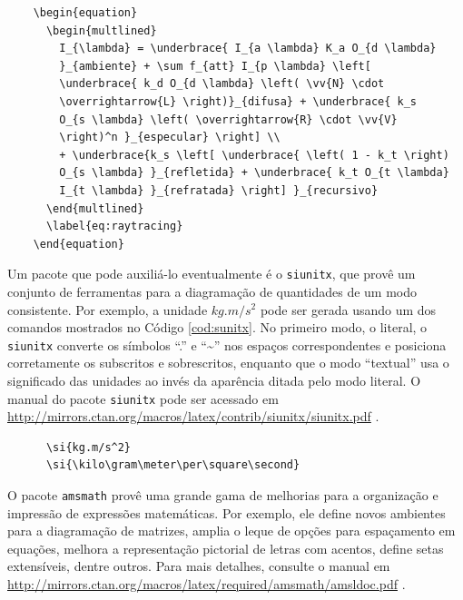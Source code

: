 \begin{listing}[ht]
	\begin{verbatim}
	\begin{equation}
	  \begin{multlined}
	    I_{\lambda} = \underbrace{ I_{a \lambda} K_a O_{d \lambda} 
	    }_{ambiente} + \sum f_{att} I_{p \lambda} \left[ 
	    \underbrace{ k_d O_{d \lambda} \left( \vv{N} \cdot 
	    \overrightarrow{L} \right)}_{difusa} + \underbrace{ k_s 
	    O_{s \lambda} \left( \overrightarrow{R} \cdot \vv{V}  
	    \right)^n }_{especular} \right] \\ 
	    + \underbrace{k_s \left[ \underbrace{ \left( 1 - k_t \right) 
	    O_{s \lambda} }_{refletida} + \underbrace{ k_t O_{t \lambda} 
	    I_{t \lambda} }_{refratada} \right] }_{recursivo}
	  \end{multlined}
	  \label{eq:raytracing}
	\end{equation}
	\end{verbatim}
	\caption{Código \LaTeX{} usado para gerar a Equação \ref{eq:raytracing}.}
	\label{cod:raytracing}
\end{listing}

Um pacote que pode auxiliá-lo eventualmente é o \texttt{siunitx}, que provê um conjunto de ferramentas para a diagramação de quantidades de um modo consistente. Por exemplo, a unidade $\si{kg.m/s^2}$ pode ser gerada usando um dos comandos mostrados no Código \ref{cod:sunitx}. No primeiro modo, o literal, o \texttt{siunitx} converte os símbolos ``.'' e ``\~{}'' nos espaços correspondentes e posiciona corretamente os subscritos e sobrescritos, enquanto que o modo ``textual'' usa o significado das unidades ao invés da aparência ditada pelo modo literal. O manual do pacote \texttt{siunitx} pode ser acessado em \url{http://mirrors.ctan.org/macros/latex/contrib/siunitx/siunitx.pdf} \parencite{siunitx}.

\begin{listing}[ht]
	\begin{verbatim}
	  \si{kg.m/s^2}
	  \si{\kilo\gram\meter\per\square\second}	
	\end{verbatim}
	\caption{Código \LaTeX{} usado para gerar a unidade $\si{\kilo\gram\meter\per\square\second}$.}
	\label{cod:sunitx}
\end{listing}

O pacote \texttt{amsmath} provê uma grande gama de melhorias para a organização e impressão de expressões matemáticas. Por exemplo, ele define novos ambientes para a diagramação de matrizes, amplia o leque de opções para espaçamento em equações, melhora a representação pictorial de letras com acentos, define setas extensíveis, dentre outros. Para mais detalhes, consulte o manual em \url{http://mirrors.ctan.org/macros/latex/required/amsmath/amsldoc.pdf} \parencite{amsmath}.

